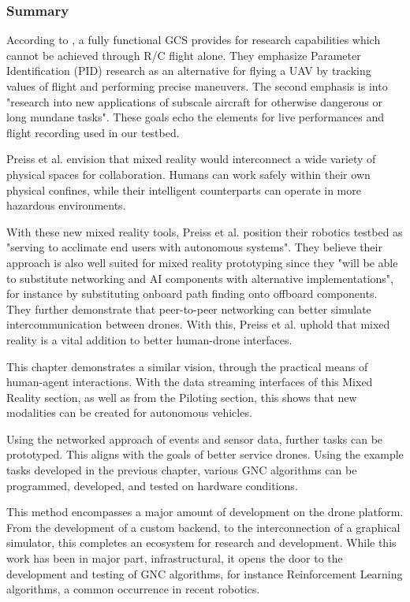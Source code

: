 \subsubsection{Summary}

According to \cite{gcs_validation}, a fully functional GCS provides for research capabilities which cannot be achieved through R/C flight alone. They emphasize Parameter Identification (PID) research as an alternative for flying a UAV by tracking values of flight and 
performing precise maneuvers. The second emphasis is into "research into new applications of subscale aircraft for otherwise dangerous or long mundane tasks". These goals echo the elements for live performances and flight recording used in our testbed.

Preiss et al. \cite{phan_hönig_ayanian_2018} envision that mixed reality would interconnect a wide variety of physical spaces for collaboration. Humans can work safely within their own physical confines, while their intelligent counterparts can operate in more hazardous environments.

With these new mixed reality tools, Preiss et al. position their robotics testbed as "serving to acclimate end users with autonomous systems". They believe their approach is also well suited for mixed reality prototyping since they "will be able to substitute networking and AI components with alternative implementations", for instance by substituting onboard path finding onto offboard components. They further demonstrate that peer-to-peer networking can better simulate intercommunication between drones. With this, Preiss et al. uphold that mixed reality is a vital addition to better human-drone interfaces. 

This chapter demonstrates a similar vision, through the practical means of human-agent interactions. With the data streaming interfaces of this Mixed Reality section, as well as from the Piloting section, this shows that new modalities can be created for autonomous vehicles.


Using the networked approach of events and sensor data, further tasks can be prototyped. This aligns with the goals of better service drones. Using the example tasks developed in the previous chapter, various GNC algorithms can be programmed, developed, and tested on hardware conditions. 

This method encompasses a major amount of development on the drone platform. From the development of a custom backend, to the interconnection of a graphical simulator, this completes an ecosystem for research and development. While this work has been in major part, infrastructural, it opens the door to the development and testing of GNC algorithms, for instance Reinforcement Learning algorithms, a common occurrence in recent robotics.


